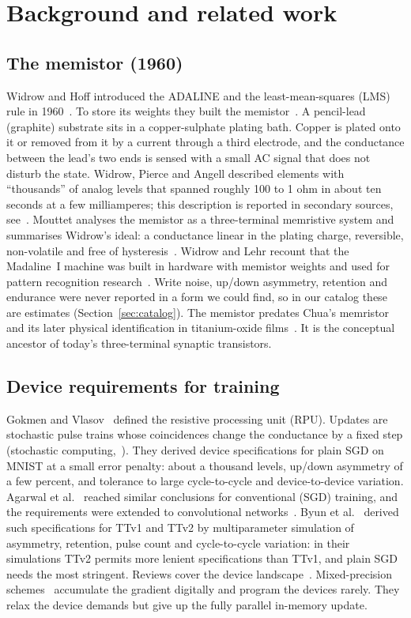 \section{Background and related work}\label{sec:background}

\subsection{The memistor (1960)}
Widrow and Hoff introduced the ADALINE and the least-mean-squares (LMS) rule in 1960~\cite{widrow1960switching}. To store its
weights they built the memistor~\cite{widrow1960adaline}. A pencil-lead (graphite) substrate sits in a copper-sulphate plating
bath. Copper is plated onto it or removed from it by a current through a third electrode, and the conductance between the
lead's two ends is sensed with a small AC signal that does not disturb the state. Widrow, Pierce and Angell described elements
with ``thousands'' of analog levels that spanned roughly 100 to 1 ohm in about ten seconds at a few milliamperes; this description
is reported in secondary sources, see~\cite{mouttet2010}. Mouttet analyses the memistor as a three-terminal memristive system
and summarises Widrow's ideal: a conductance linear in the plating charge, reversible, non-volatile and free of
hysteresis~\cite{mouttet2010}. Widrow and Lehr recount that the Madaline~I machine was built in hardware with memistor weights and used for pattern
recognition research~\cite{widrow1990}.
Write noise, up/down asymmetry, retention and endurance were never reported in a form we could find, so in our catalog these
are estimates (Section~\ref{sec:catalog}). The memistor predates Chua's memristor~\cite{chua1971} and its later physical
identification in titanium-oxide films~\cite{strukov2008}. It is the conceptual ancestor of today's three-terminal synaptic
transistors.

\subsection{Device requirements for training}
Gokmen and Vlasov~\cite{gokmen2016} defined the resistive processing unit (RPU). Updates are stochastic pulse trains whose
coincidences change the conductance by a fixed step (stochastic computing,~\cite{gaines1967}). They derived device
specifications for plain SGD on MNIST at a small error penalty: about a thousand levels, up/down asymmetry of a few percent, and
tolerance to large cycle-to-cycle and device-to-device variation. Agarwal et al.~\cite{agarwal2016} reached similar conclusions for conventional (SGD) training, and the requirements were extended to convolutional networks~\cite{gokmen2017cnn}.
Byun et al.~\cite{byun2024} derived such specifications for
TTv1 and TTv2 by multiparameter simulation of asymmetry, retention, pulse count and cycle-to-cycle variation: in their simulations TTv2 permits more lenient specifications than TTv1, and plain SGD needs the most stringent.
Reviews cover the device
landscape~\cite{burr2017,ielmini2018,sebastian2020,haensch2019}. Mixed-precision schemes~\cite{nandakumar2020} accumulate the
gradient digitally and program the devices rarely. They relax the device demands but give up the fully parallel in-memory update.

